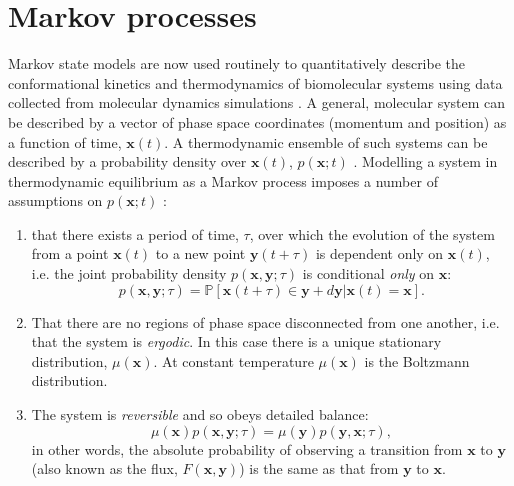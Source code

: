 \section{Markov processes}
Markov state models are now used routinely to quantitatively describe the conformational kinetics and thermodynamics of biomolecular systems using data collected from molecular dynamics simulations \cite{wangConstructingMarkovState2018c,noeMarkovModelsMolecular2019b}. A general, molecular system can be described by a vector of phase space coordinates  (momentum and position) as a function of time, $\mathbf{x}(t)$. A thermodynamic ensemble of such systems can be described by a probability density over $\mathbf{x}(t)$, $p(\mathbf{x}; t)$ \cite{prinzMarkovModelsMolecular2011}. Modelling a system in thermodynamic equilibrium as a Markov process imposes a number of assumptions on $p(\mathbf{x}; t)$ \cite{prinzMarkovModelsMolecular2011}:
\begin{enumerate}
    \item that there exists a period of time, $\tau$, over which the evolution of the system from a point $\mathbf{x}(t)$ to a new point $\mathbf{y}(t+\tau)$ is dependent only on $\mathbf{x}(t)$, i.e. the joint probability density $p(\mathbf{x}, \mathbf{y} ; \tau)$ is conditional \emph{only} on $\mathbf{x}$:
    \begin{equation}\label{eqn:markov_assumption}
    p(\mathbf{x}, \mathbf{y} ; \tau)=\mathbb{P}\left[\mathbf{x}(t+\tau) \in \mathbf{y}+d \mathbf{y} | \mathbf{x}(t)=\mathbf{x}\right].
    \end{equation}
    \item That there are no regions of phase space disconnected from one another, i.e. that the system is \emph{ergodic}. In this case there is a unique stationary distribution,  $\mu(\mathbf{x})$. At constant temperature $\mu(\mathbf{x})$ is the Boltzmann distribution. 
    \item The system is \emph{reversible} and so obeys detailed balance: 
    \begin{equation}\label{eqn:detailed_balance}
    \mu(\mathbf{x}) p(\mathbf{x}, \mathbf{y} ; \tau)=\mu(\mathbf{y}) p(\mathbf{y}, \mathbf{x} ; \tau), 
    \end{equation}
    in other words, the absolute probability of observing a transition from $\mathbf{x}$ to $\mathbf{y}$ (also known as the flux, $F(\mathbf{x}, \mathbf{y})$) is the same as that from $\mathbf{y}$ to $\mathbf{x}$. 
\end{enumerate}

